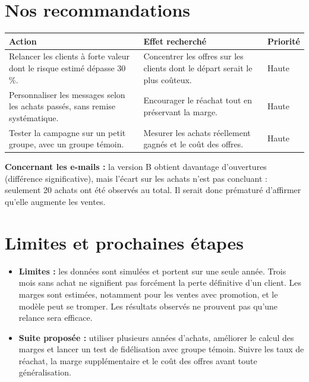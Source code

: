 \documentclass[11pt,a4paper]{article}
\begin{document}
\section{Nos recommandations}
\begin{center}
\begin{tabularx}{\linewidth}{>{\raggedright\arraybackslash}X >{\raggedright\arraybackslash}p{4.1cm} >{\centering\arraybackslash}p{1.5cm}}
\toprule
\textbf{Action} & \textbf{Effet recherché} & \textbf{Priorité}\\
\midrule
Relancer les clients à forte valeur dont le risque estimé dépasse 30\,\%. & Concentrer les offres sur les clients dont le départ serait le plus coûteux. & Haute\\
Personnaliser les messages selon les achats passés, sans remise systématique. & Encourager le réachat tout en préservant la marge. & Haute\\
Tester la campagne sur un petit groupe, avec un groupe témoin. & Mesurer les achats réellement gagnés et le coût des offres. & Haute\\
\bottomrule
\end{tabularx}
\end{center}

\textbf{Concernant les e-mails :} la version B obtient davantage d'ouvertures (différence significative), mais l'écart sur les achats n'est pas concluant : seulement 20 achats ont été observés au total. Il serait donc prématuré d'affirmer qu'elle augmente les ventes.

\section{Limites et prochaines étapes}
\begin{itemize}
\item \textbf{Limites :} les données sont simulées et portent sur une seule année. Trois mois sans achat ne signifient pas forcément la perte définitive d'un client. Les marges sont estimées, notamment pour les ventes avec promotion, et le modèle peut se tromper. Les résultats observés ne prouvent pas qu'une relance sera efficace.
\item \textbf{Suite proposée :} utiliser plusieurs années d'achats, améliorer le calcul des marges et lancer un test de fidélisation avec groupe témoin. Suivre les taux de réachat, la marge supplémentaire et le coût des offres avant toute généralisation.
\end{itemize}
\end{document}
